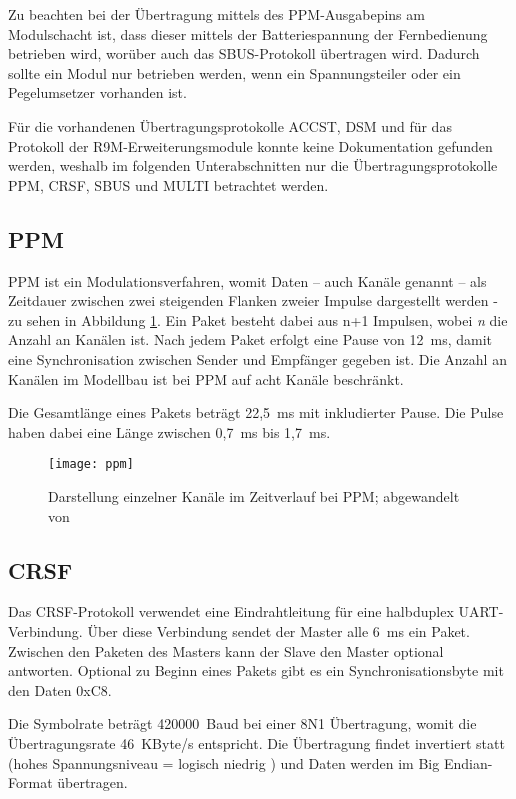 Zu beachten bei der Übertragung mittels des PPM-Ausgabepins am Modulschacht ist, dass dieser mittels der Batteriespannung der Fernbedienung betrieben wird, worüber auch das SBUS-Protokoll übertragen wird. Dadurch sollte ein Modul nur betrieben werden, wenn ein Spannungsteiler oder ein Pegelumsetzer vorhanden ist. \cite{opentxFAQ}

Für die vorhandenen Übertragungsprotokolle ACCST, DSM und für das Protokoll der R9M-Erweiterungsmodule konnte keine Dokumentation gefunden werden, weshalb im folgenden Unterabschnitten nur die Übertragungsprotokolle \ac{PPM}, CRSF, SBUS und MULTI betrachtet werden.

\subsection{\acf{PPM}}
\ac{PPM} ist ein Modulationsverfahren, womit Daten -- auch Kanäle genannt -- als Zeitdauer zwischen zwei steigenden Flanken zweier Impulse dargestellt werden - zu sehen in Abbildung \ref{fig:ppmtime}. Ein Paket besteht dabei aus n+1 Impulsen, wobei \textit{n} die Anzahl an Kanälen ist. Nach jedem Paket erfolgt eine Pause von 12~ms, damit eine Synchronisation zwischen Sender und Empfänger gegeben ist. Die Anzahl an Kanälen im Modellbau ist bei \ac{PPM} auf acht Kanäle beschränkt. \cite{hornppm}

Die Gesamtlänge eines Pakets beträgt 22,5~ms mit inkludierter Pause. Die Pulse haben dabei eine Länge zwischen 0,7~ms bis 1,7~ms. \cite{opentxppm}

\begin{figure}[h]
    \centering
    \texttt{[image: ppm]}
    \caption{Darstellung einzelner Kanäle im Zeitverlauf bei \acs{PPM}; abgewandelt von \cite{hornppm}}
    \label{fig:ppmtime}
\end{figure}

\subsection{CRSF}
Das CRSF-Protokoll verwendet eine Eindrahtleitung für eine halbduplex \ac{UART}-Verbindung. Über diese Verbindung sendet der Master alle 6~ms ein Paket. Zwischen den Paketen des Masters kann der Slave den Master optional antworten. Optional zu Beginn eines Pakets gibt es ein Synchronisationsbyte mit den Daten 0xC8. \cites{cleanflightCrsf}{cleanflightCrsfP}

Die Symbolrate beträgt 420000~Baud bei einer 8N1 Übertragung, womit die Übertragungsrate 46~KByte/s entspricht. Die Übertragung findet invertiert statt (hohes Spannungsniveau = logisch niedrig \cite{sigrokSBus}) und Daten werden im Big Endian-Format übertragen. \cite{cleanflightCrsf}

